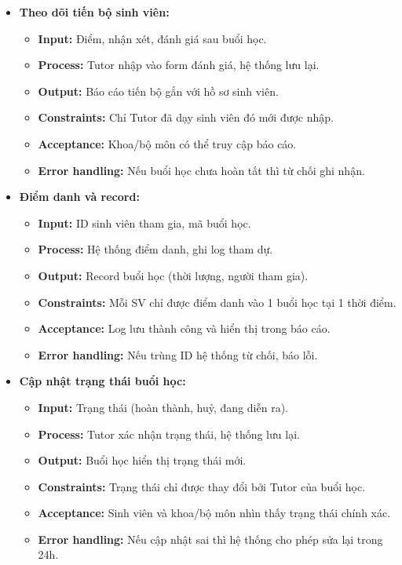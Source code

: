 \begin{itemize}
    \item \textbf{Theo dõi tiến bộ sinh viên:}
    \begin{itemize}
        \item \textbf{Input:} Điểm, nhận xét, đánh giá sau buổi học.
        \item \textbf{Process:} Tutor nhập vào form đánh giá, hệ thống lưu lại.
        \item \textbf{Output:} Báo cáo tiến bộ gắn với hồ sơ sinh viên.
        \item \textbf{Constraints:} Chỉ Tutor đã dạy sinh viên đó mới được nhập.
        \item \textbf{Acceptance:} Khoa/bộ môn có thể truy cập báo cáo.
        \item \textbf{Error handling:} Nếu buổi học chưa hoàn tất thì từ chối ghi nhận.
    \end{itemize}
    
    \item \textbf{Điểm danh và record:}
    \begin{itemize}
        \item \textbf{Input:} ID sinh viên tham gia, mã buổi học.
        \item \textbf{Process:} Hệ thống điểm danh, ghi log tham dự.
        \item \textbf{Output:} Record buổi học (thời lượng, người tham gia).
        \item \textbf{Constraints:} Mỗi SV chỉ được điểm danh vào 1 buổi học tại 1 thời điểm.
        \item \textbf{Acceptance:} Log lưu thành công và hiển thị trong báo cáo.
        \item \textbf{Error handling:} Nếu trùng ID hệ thống từ chối, báo lỗi.
    \end{itemize}
    
    \item \textbf{Cập nhật trạng thái buổi học:}
    \begin{itemize}
        \item \textbf{Input:} Trạng thái (hoàn thành, huỷ, đang diễn ra).
        \item \textbf{Process:} Tutor xác nhận trạng thái, hệ thống lưu lại.
        \item \textbf{Output:} Buổi học hiển thị trạng thái mới.
        \item \textbf{Constraints:} Trạng thái chỉ được thay đổi bởi Tutor của buổi học.
        \item \textbf{Acceptance:} Sinh viên và khoa/bộ môn nhìn thấy trạng thái chính xác.
        \item \textbf{Error handling:} Nếu cập nhật sai thì hệ thống cho phép sửa lại trong 24h.
    \end{itemize}


\end{itemize}
